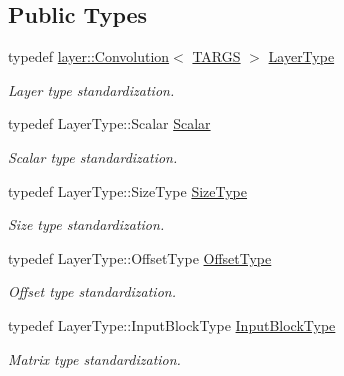 \subsection*{Public Types}
\begin{DoxyCompactItemize}
\item 
typedef \hyperlink{classffnn_1_1layer_1_1_convolution}{layer\-::\-Convolution}$<$ \hyperlink{local__convolution_8hpp_a005b9b79411aa786124330e813a99057}{T\-A\-R\-G\-S} $>$ \hyperlink{classffnn_1_1optimizer_1_1_gradient_descent_3_01layer_1_1_convolution_3_01_t_a_r_g_s_01_4_01_4_a4b4e11ad265dd0fba9010b60d6cea09b}{Layer\-Type}
\begin{DoxyCompactList}\small\item\em Layer type standardization. \end{DoxyCompactList}\item 
typedef Layer\-Type\-::\-Scalar \hyperlink{classffnn_1_1optimizer_1_1_gradient_descent_3_01layer_1_1_convolution_3_01_t_a_r_g_s_01_4_01_4_a6995cac929c8df2dd70dddf488998e66}{Scalar}
\begin{DoxyCompactList}\small\item\em Scalar type standardization. \end{DoxyCompactList}\item 
typedef Layer\-Type\-::\-Size\-Type \hyperlink{classffnn_1_1optimizer_1_1_gradient_descent_3_01layer_1_1_convolution_3_01_t_a_r_g_s_01_4_01_4_a02796dc7270c0180e5e0cfa57e015dde}{Size\-Type}
\begin{DoxyCompactList}\small\item\em Size type standardization. \end{DoxyCompactList}\item 
typedef Layer\-Type\-::\-Offset\-Type \hyperlink{classffnn_1_1optimizer_1_1_gradient_descent_3_01layer_1_1_convolution_3_01_t_a_r_g_s_01_4_01_4_adeba594318f6939122d3e0edb069d6d6}{Offset\-Type}
\begin{DoxyCompactList}\small\item\em Offset type standardization. \end{DoxyCompactList}\item 
typedef Layer\-Type\-::\-Input\-Block\-Type \hyperlink{classffnn_1_1optimizer_1_1_gradient_descent_3_01layer_1_1_convolution_3_01_t_a_r_g_s_01_4_01_4_a52ff7f9db21ea50795ccbc475a3cc643}{Input\-Block\-Type}
\begin{DoxyCompactList}\small\item\em Matrix type standardization. \end{DoxyCompactList}\item 

\end{DoxyCompactItemize}
